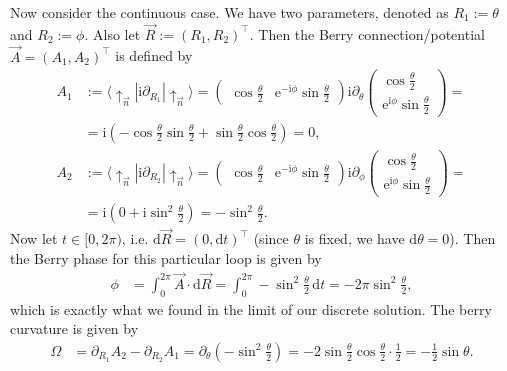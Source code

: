\documentclass[english, parskip=full]{scrartcl}
\newcommand{\braket}{}
\newcommand{\kla}{}
\newcommand{\tecxt}{}
\renewcommand{\i}{\text{i}}
\newcommand{\e}{\text{e}}
\begin{document}
Now consider the continuous case.
We have two parameters, denoted as $R_1 := \theta$ and $R_2 := \phi$.
Also let $\vec{R} := (R_1,R_2)^\top$.
Then the Berry connection/potential $\vec{A} = (A_1, A_2)^\top$ is defined by
\begin{align}
A_1 &:= \braket\langle \uparrow_{\vec{n}} | \i\partial_{R_1} | \uparrow_{\vec{n}} \rangle = \begin{pmatrix}
\cos\frac{\theta}{2} & \e^{-\i\phi}\sin\frac{\theta}{2}
\end{pmatrix} \i\partial_\theta\begin{pmatrix}
\cos\frac{\theta}{2} \\ \e^{\i\phi}\sin\frac{\theta}{2}
\end{pmatrix} = \\
&= \i\kla\left( -\cos\frac{\theta}{2}\sin\frac{\theta}{2} + \sin\frac{\theta}{2}\cos\frac{\theta}{2} \right) = 0, \\
A_2 &:= \braket\langle \uparrow_{\vec{n}} | \i\partial_{R_2} | \uparrow_{\vec{n}} \rangle = \begin{pmatrix}
\cos\frac{\theta}{2} & \e^{-\i\phi}\sin\frac{\theta}{2}
\end{pmatrix} \i\partial_\phi\begin{pmatrix}
\cos\frac{\theta}{2} \\ \e^{\i\phi}\sin\frac{\theta}{2}
\end{pmatrix} = \\
&= \i\kla\left( 0 + \i\sin^2\frac{\theta}{2}  \right) = -\sin^2\frac{\theta}{2}.
\end{align}
Now let $t\in [0,2\pi)$, i.e. $\tecxt\text{d}\vec{R} = (0, \tecxt\text{d}t)^\top$ (since $\theta$ is fixed, we have $\tecxt\text{d}\theta = 0$).
Then the Berry phase for this particular loop is given by
\begin{align}
\phi &= \int_{0}^{2\pi} \vec{A} \cdot \mathrm{d}\vec{R} = \int_{0}^{2\pi} -\sin^2\frac{\theta}{2}\, \mathrm{d}t = -2\pi\sin^2\frac{\theta}{2},
\end{align}
which is exactly what we found in the limit of our discrete solution.
The berry curvature is given by
\begin{align}
\Omega &= \partial_{R_1}A_2 - \partial_{R_2}A_1 = \partial_\theta \kla\left( -\sin^2\frac{\theta}{2} \right) = -2\sin\frac{\theta}{2}\cos\frac{\theta}{2} \cdot \frac{1}{2} = -\frac{1}{2}\sin\theta.
\end{align}

\newpage
\end{document}
